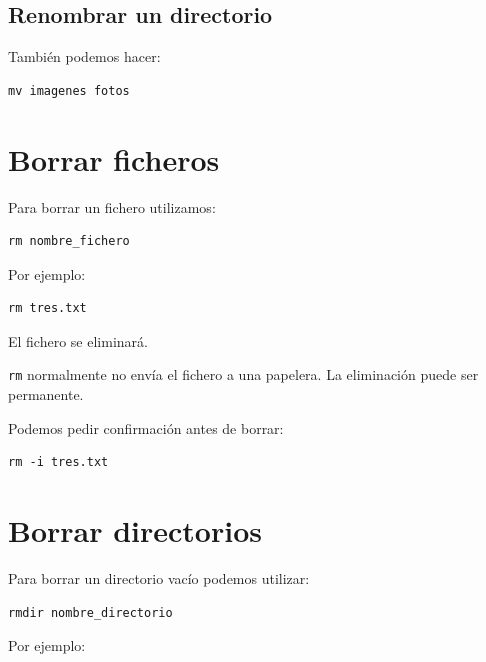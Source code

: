 \documentclass[11pt,a4paper]{article}
\begin{document}
\subsection{Renombrar un directorio}


También podemos hacer:


\begin{lstlisting}
mv imagenes fotos
\end{lstlisting}


\section{Borrar ficheros}


Para borrar un fichero utilizamos:


\begin{lstlisting}
rm nombre_fichero
\end{lstlisting}


\noindent Por ejemplo:


\begin{lstlisting}
rm tres.txt
\end{lstlisting}


\noindent El fichero se eliminará.


\begin{peligro}
\texttt{rm} normalmente no envía el fichero a una papelera. La eliminación puede ser permanente.
\end{peligro}


\noindent Podemos pedir confirmación antes de borrar:


\begin{lstlisting}
rm -i tres.txt
\end{lstlisting}


\section{Borrar directorios}


Para borrar un directorio vacío podemos utilizar:


\begin{lstlisting}
rmdir nombre_directorio
\end{lstlisting}


\noindent Por ejemplo:
\end{document}
